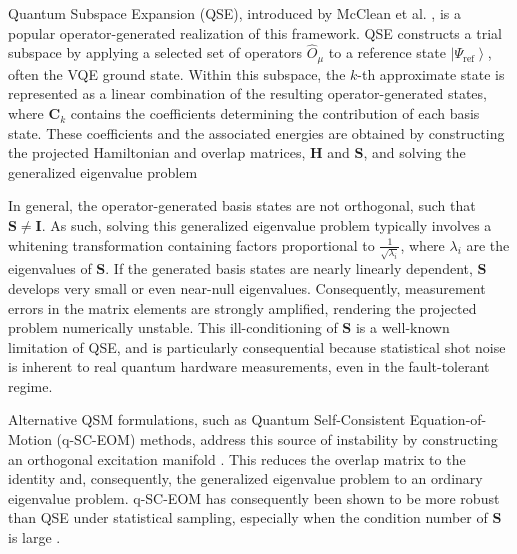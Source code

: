 Quantum Subspace Expansion (QSE), introduced by McClean et al. \cite{mcclean2017qse}, is a popular operator-generated realization of this framework. 
QSE constructs a trial subspace by applying a selected set of operators ${\hat{O}_{\mu}}$ to a reference state $\left|\Psi_{\mathrm{ref}}\right\rangle$, often the VQE ground state. 
Within this subspace, the $k$-th approximate state is represented as a linear combination of the resulting operator-generated states,
\KthReferenceStateEquation
where $\mathbf{C}_k$ contains the coefficients determining the contribution of each basis state.
These coefficients and the associated energies are obtained by constructing the projected Hamiltonian and overlap matrices, $\mathbf{H}$ and $\mathbf{S}$, and solving the generalized eigenvalue problem 
\GeneralisedEigenvalueProblemKEquation

In general, the operator-generated basis states are not orthogonal, such that $\mathbf{S} \neq \mathbf{I}$. As such, solving this generalized eigenvalue problem typically involves a whitening transformation containing factors proportional to $\frac{1}{\sqrt{\lambda_i}}$, where $\lambda_i$ are the eigenvalues of $\mathbf{S}$. 
If the generated basis states are nearly linearly dependent,  $\mathbf{S}$ develops very small or even near-null eigenvalues. 
Consequently, measurement errors in the matrix elements are strongly amplified, rendering the projected problem numerically unstable. This ill-conditioning of $\mathbf{S}$ is a well-known limitation of QSE, and is particularly consequential because statistical shot noise is inherent to real quantum hardware measurements, even in the fault-tolerant regime.

Alternative QSM formulations, such as Quantum Self-Consistent Equation-of-Motion (q-SC-EOM) methods, address this source of instability by constructing an orthogonal excitation manifold \cite{Asthana2023QscEOM}. 
This reduces the overlap matrix to the identity and, consequently, the generalized eigenvalue problem to an ordinary eigenvalue problem. 
q-SC-EOM has consequently been shown to be more robust than QSE under statistical sampling, especially when the condition number of $\mathbf{S}$ is large \cite{Kwao2026QSMGeneralisedEigenvalueProblem, sundar2026qscEOMWorkflow}.

